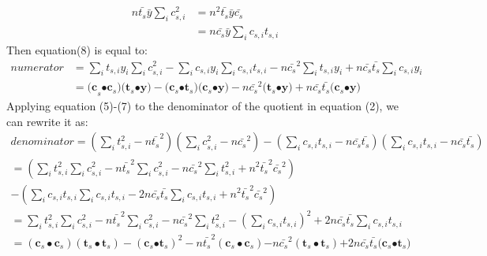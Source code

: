 \begin{appendices}
\begin{equation}\label{eq9}
\begin{aligned}
n\bar{t_{s}}\bar{y}\sum\nolimits_i c_{s,i}^{2} &=n^{2}\bar{t_{s}}\bar{y}\bar{c_{s}}\\
&=n\bar{c_{s}}\bar{y}\sum\nolimits_i {c_{s,i}t_{s,i}}
\end{aligned}
\end{equation}
Then equation(8) is equal to:
\begin{equation}\label{eq10}
\begin{aligned}
numerator&=\sum\nolimits_i {t_{s,i}y_{i}} \sum\nolimits_i c_{s,i}^{2} -\sum\nolimits_i {c_{s,i}y_{i}} \sum\nolimits_i {c_{s,i}t_{s,i}} -n\bar{c_{s}}^{2}\sum\nolimits_i {t_{s,i}y_{i}} +n\bar{c_{s}}\bar{t_{s}}\sum\nolimits_i {c_{s,i}y_{i}}\\
 & ={(\mathbf{c}}_{s}\mathbf{\bullet }\mathbf{c}_{s}\mathbf{)(}\mathbf{t}_{s}\mathbf{\bullet y)}-(\mathbf{c}_{s}\mathbf{\bullet }\mathbf{t}_{s}\mathbf{)(}\mathbf{c}_{s}\mathbf{\bullet y)}-n\bar{c_{s}}^{2}\mathbf{(}\mathbf{t}_{s}\mathbf{\bullet y)+}n\bar{c_{s}}\bar{t_{s}}(\mathbf{c}_{s}\mathbf{\bullet y)}
 \end{aligned}
\end{equation}
Applying equation (5)-(7) to the denominator of the quotient in equation (2), we can rewrite it as:
\begin{equation}\label{eq11}
\begin{array}{l}
denominator=\left( \sum\nolimits_i t_{s,i}^{2} -n\bar{t_{s}}^{2} \right)\left( \sum\nolimits_i c_{s,i}^{2} -n\bar{c_{s}}^{2} \right)-\left( \sum\nolimits_i {c_{s,i}t_{s,i}} -n\bar{c_{s}}\bar{t_{s}} \right)\left( \sum\nolimits_i {c_{s,i}t_{s,i}} -n\bar{c_{s}}\bar{t_{s}} \right)\\
=\left( \sum\nolimits_i t_{s,i}^{2} \sum\nolimits_i c_{s,i}^{2} -n\bar{t_{s}}^{2}\sum\nolimits_i c_{s,i}^{2} -n\bar{c_{s}}^{2}\sum\nolimits_i t_{s,i}^{2} +n^{2}\bar{t_{s}}^{2}\bar{c_{s}}^{2} \right)\\
-\left( \sum\nolimits_i {c_{s,i}t_{s,i}} \sum\nolimits_i {c_{s,i}t_{s,i}} -2n\bar{c_{s}}\bar{t_{s}}\sum\nolimits_i {c_{s,i}t_{s,i}} +n^{2}\bar{t_{s}}^{2}\bar{c_{s}}^{2} \right)\\
=\sum\nolimits_i t_{s,i}^{2} \sum\nolimits_i c_{s,i}^{2} -n\bar{t_{s}}^{2}\sum\nolimits_i c_{s,i}^{2} -n\bar{c_{s}}^{2}\sum\nolimits_i t_{s,i}^{2} -\left( \sum\nolimits_i {c_{s,i}t_{s,i}} \right)^{2}+2n\bar{c_{s}}\bar{t_{s}}\sum\nolimits_i {c_{s,i}t_{s,i}} \\
=\left( \mathbf{c}_{s}\bullet \mathbf{c}_{s} \right)\left( \mathbf{t}_{s}\bullet \mathbf{t}_{s} \right)-\left( \mathbf{c}_{s}\mathbf{\bullet }\mathbf{t}_{s} \right)^{2}-n\bar{t_{s}}^{2}\left( \mathbf{c}_{s}\bullet \mathbf{c}_{s} \right)\mathbf{-}n\bar{c_{s}}^{2}\left( \mathbf{t}_{s}\bullet \mathbf{t}_{s} \right)\mathbf{+}2n\bar{c_{s}}\bar{t_{s}}\mathbf{(}\mathbf{c}_{s}\mathbf{\bullet }\mathbf{t}_{s}\mathbf{)}
\end{array}
\end{equation}

\end{appendices}